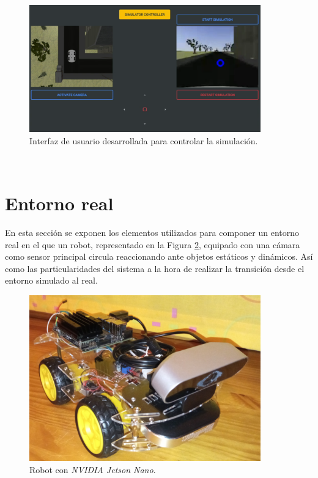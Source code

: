\begin{figure} [h!]
	\begin{center}
		\includegraphics[width=10cm]{figs/GUI}
	\end{center}
	\caption{Interfaz de usuario desarrollada para controlar la simulación.}
	\label{fig:gui}
\end{figure}\

\section{Entorno real}
\label{section:real}
En esta sección se exponen los elementos utilizados para componer un entorno real en el que un robot, representado en la Figura \ref{fig:realrobot}, equipado con una cámara como sensor principal circula reaccionando ante objetos estáticos y dinámicos. Así como las particularidades del sistema a la hora de realizar la transición desde el entorno simulado al real.\\

\begin{figure} [h!]
	\begin{center}
		\includegraphics[width=10cm]{figs/robot}
	\end{center}
	\caption{Robot con \textit{NVIDIA Jetson Nano}.}
	\label{fig:realrobot}
\end{figure}\

